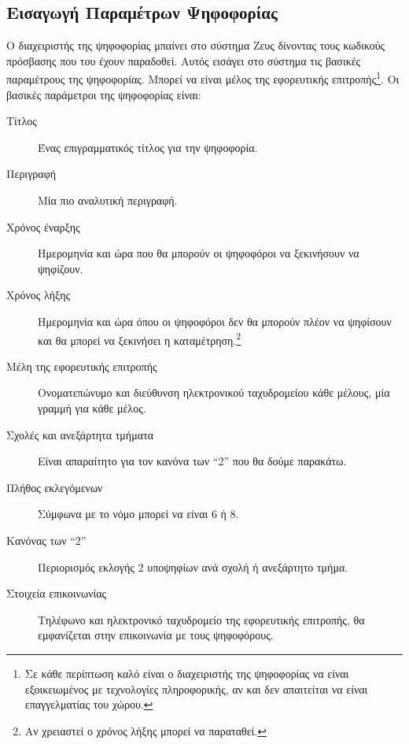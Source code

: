 \documentclass{tufte-handout}
\begin{document}
\subsection{Εισαγωγή Παραμέτρων Ψηφοφορίας}

Ο διαχειριστής της ψηφοφορίας μπαίνει στο σύστημα Ζευς δίνοντας τους
κωδικούς πρόσβασης που του έχουν παραδοθεί. Αυτός εισάγει
στο σύστημα τις βασικές παραμέτρους της ψηφοφορίας. Μπορεί να είναι
μέλος της εφορευτικής επιτροπής\footnote{Σε κάθε περίπτωση καλό είναι
  ο διαχειριστής της ψηφοφορίας να είναι εξοικειωμένος με τεχνολογίες
  πληροφορικής, αν και δεν απαιτείται να είναι επαγγελματίας του
  χώρου.}. Οι βασικές παράμετροι της ψηφοφορίας είναι:

\begin{description}

\item[Τίτλος] Ένας επιγραμματικός τίτλος για την ψηφοφορία.

\item[Περιγραφή] Μία πιο αναλυτική περιγραφή.

\item[Χρόνος έναρξης] Ημερομηνία και ώρα που θα μπορούν οι ψηφοφόροι
  να ξεκινήσουν να ψηφίζουν.

\item[Χρόνος λήξης] Ημερομηνία και ώρα όπου οι ψηφοφόροι δεν θα
  μπορούν πλέον να ψηφίσουν και θα μπορεί να ξεκινήσει η
  καταμέτρηση.\footnote{Αν χρειαστεί ο χρόνος λήξης μπορεί να
    παραταθεί.}

\item[Μέλη της εφορευτικής επιτροπής] Ονοματεπώνυμο και διεύθυνση
  ηλεκτρονικού ταχυδρομείου κάθε μέλους, μία γραμμή για κάθε μέλος.

\item[Σχολές και ανεξάρτητα τμήματα] Είναι απαραίτητο για τον κανόνα
  των ``2'' που θα δούμε παρακάτω.

\item[Πλήθος εκλεγόμενων] Σύμφωνα με το νόμο μπορεί να είναι 6 ή 8.

\item[Κανόνας των ``2''] Περιορισμός εκλογής 2 υποψηφίων ανά σχολή ή
  ανεξάρτητο τμήμα.

\item[Στοιχεία επικοινωνίας] Τηλέφωνο και ηλεκτρονικό ταχυδρομείο της
  εφορευτικής επιτροπής, θα εμφανίζεται στην επικοινωνία με τους ψηφοφόρους.

\end{description}
\end{document}

